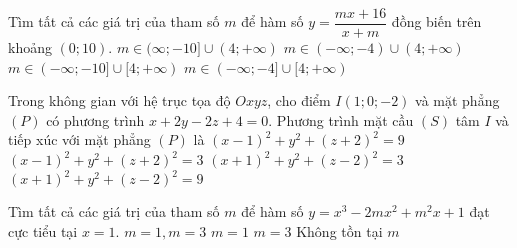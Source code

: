 \begin{ex}%
Tìm tất cả các giá trị của tham số $m$ để hàm số $y = \dfrac{mx + 16}{x+m}$ đồng biến trên khoảng $(0;10)$.
\choice
{\True $m\in (\infty; -10] \cup (4;+\infty)$}
{$m \in (-\infty; -4) \cup (4; +\infty)$}
{$m \in (-\infty; -10] \cup [4;+\infty)$}
{$m\in (-\infty; -4] \cup [4;+\infty)$}
\end{ex}

\begin{ex}%
Trong không gian với hệ trục tọa độ $Oxyz$, cho điểm $I(1;0;-2)$ và mặt phẳng $(P)$ có phương trình $x + 2y -2z +4 =0$. Phương trình mặt cầu $(S)$ tâm $I$ và tiếp xúc với mặt phẳng $(P)$ là
\choice
{\True $(x-1)^2 + y^2 + (z+2)^2 =9$}
{$(x-1)^2 +y^2 + (z+2)^2 =3$}
{$(x+1)^2 + y^2 + (z-2)^2 =3$}
{$(x+1)^2 + y^2 + (z-2)^2 =9$}
\end{ex}

\begin{ex}%
Tìm tất cả các giá trị của tham số $m$ để hàm số $y=x^3 -2mx^2 +m^2 x+1$ đạt cực tiểu tại $x=1$.
\choice
{$m=1,m=3$}
{\True $m=1$}
{$m=3$}
{Không tồn tại $m$}
\end{ex}


